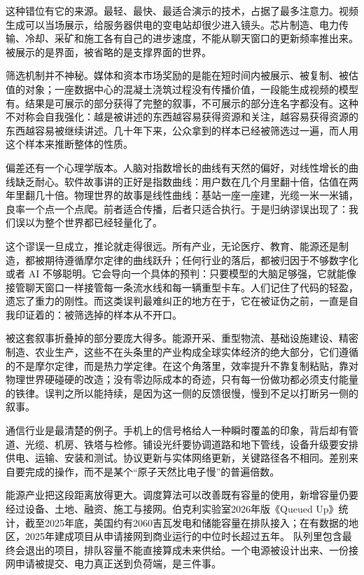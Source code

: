 这种错位有它的来源。最轻、最快、最适合演示的技术，占据了最多注意力。视频生成可以当场展示，给服务器供电的变电站却很少进入镜头。芯片制造、电力传输、冷却、采矿和施工各有自己的进步速度，不能从聊天窗口的更新频率推出来。被展示的是界面，被省略的是支撑界面的世界。

筛选机制并不神秘。媒体和资本市场奖励的是能在短时间内被展示、被复制、被估值的对象；一座数据中心的混凝土浇筑过程没有传播价值，一段能生成视频的模型有。结果是可展示的部分获得了完整的叙事，不可展示的部分连名字都没有。这种不对称会自我强化：越是被讲述的东西越容易获得资源和关注，越容易获得资源的东西越容易被继续讲述。几十年下来，公众拿到的样本已经被筛选过一遍，而人用这个样本来推断整体的性质。

偏差还有一个心理学版本。人脑对指数增长的曲线有天然的偏好，对线性增长的曲线缺乏耐心。软件故事讲的正好是指数曲线：用户数在几个月里翻十倍，估值在两年里翻几十倍。物理世界的故事是线性曲线：基站一座一座建，光缆一米一米铺，良率一个点一个点爬。前者适合传播，后者只适合执行。于是归纳谬误出现了：我们误以为整个世界都已经轻量化了。

这个谬误一旦成立，推论就走得很远。所有产业，无论医疗、教育、能源还是制造，都被期待遵循摩尔定律的曲线跃升；任何行业的落后，都被归因于不够数字化或者 AI 不够聪明。它会导向一个具体的预判：只要模型的大脑足够强，它就能像接管聊天窗口一样接管每一条流水线和每一辆重型卡车。人们记住了代码的轻盈，遗忘了重力的刚性。而这类误判最难纠正的地方在于，它在被证伪之前，一直是自我印证着的：被筛选掉的样本从不开口。


被这套叙事折叠掉的部分要庞大得多。能源开采、重型物流、基础设施建设、精密制造、农业生产，这些不在头条里的产业构成全球实体经济的绝大部分，它们遵循的不是摩尔定律，而是热力学定律。在这个角落里，效率提升不靠复制粘贴，靠对物理世界硬碰硬的改造；没有零边际成本的奇迹，只有每一份做功都必须支付能量的铁律。误判之所以能持续，是因为这一侧的反馈很慢，慢到不足以打断另一侧的叙事。

通信行业是最清楚的例子。手机上的信号格给人一种瞬时覆盖的印象，背后却有管道、光缆、机房、铁塔与检修。铺设光纤要协调道路和地下管线，设备升级要安排供电、运输、安装和测试。协议更新与实体网络更新，关键路径各不相同。差别来自要完成的操作，而不是某个“原子天然比电子慢”的普遍倍数。

能源产业把这段距离放得更大。调度算法可以改善既有容量的使用，新增容量仍要经过设备、土地、融资、施工与接网。伯克利实验室2026年版《Queued Up》统计，截至2025年底，美国约有2060吉瓦发电和储能容量在排队接入；在有数据的地区，2025年建成项目从申请接网到商业运行的中位时长超过五年。\cite{berkeley2026queues} 队列里包含最终会退出的项目，排队容量不能直接算成未来供给。一个电源被设计出来、一份接网申请被提交、电力真正送到负荷端，是三件事。

